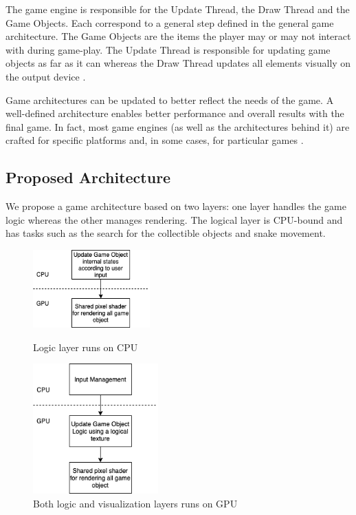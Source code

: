 \documentclass[runningheads]{llncs}
\begin{document}
The game engine is responsible for the Update Thread, the Draw Thread and the Game Objects. Each correspond to a general step defined in the general game architecture. The Game Objects are the items the player may or may not interact with during game-play. The Update Thread  is responsible for updating game objects as far as it can whereas the Draw Thread updates all elements visually on the output device \cite{portales}.

Game architectures can be updated to better reflect the needs of the game. A well-defined architecture enables better performance and overall results with the final game. In fact, most game engines (as well as the architectures behind it) are crafted for specific platforms and, in some cases, for particular games \cite{gregory_2019}.

\subsection{Proposed Architecture} \label{sec:proposed-architecture}
We propose a game architecture based on two layers:
one layer handles the game logic whereas the other manages rendering.  The logical layer is CPU-bound and has tasks such as the search for the collectible objects and snake movement.

\begin{figure}
    \centering
    \begin{minipage}[b][6cm][b]{.5\textwidth}
        \centering
        \includegraphics[height=3cm]{hci2020-paper/images/VRSnake_Proposed_Architecture.png}
        \caption{Logic layer runs on CPU}
        \label{fig:coupledModel}
    \end{minipage}%
    \begin{minipage}[b][6cm][b]{.5\textwidth}
        \centering
        \includegraphics[height=5cm]{hci2020-paper/images/VRSnake_Proposed_Architecture2.png}
        \caption{Both logic and visualization layers runs on GPU}
        \label{fig:uncoupledModel}
    \end{minipage}
\end{figure}
\end{document}
